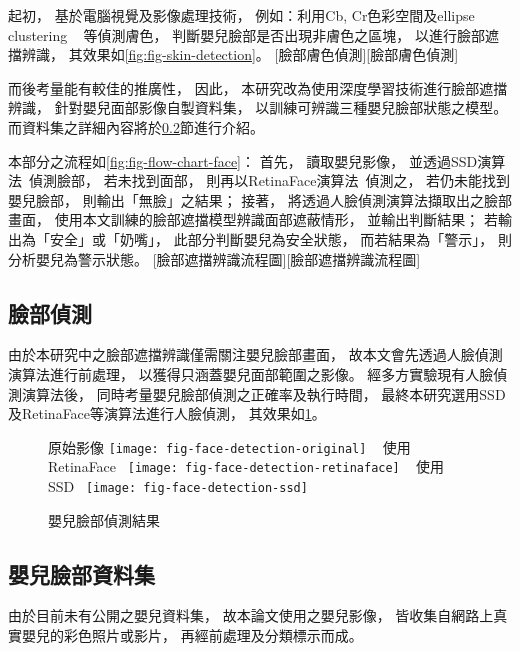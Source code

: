 \documentclass[class=NCU_thesis, crop=false]{standalone}
\begin{document}
起初，
基於電腦視覺及影像處理技術，
例如：利用Cb, Cr色彩空間及ellipse clustering
~\cite{tang_hands_2008, li_face_2011, noauthor_python_nodate, walkonnet_python_nodate}
等偵測膚色，
判斷嬰兒臉部是否出現非膚色之區塊，
以進行臉部遮擋辨識，
其效果如\cref{fig:fig-skin-detection}。
[臉部膚色偵測][臉部膚色偵測]

而後考量能有較佳的推廣性，
因此，
本研究改為使用深度學習技術進行臉部遮擋辨識，
針對嬰兒面部影像自製資料集，
以訓練可辨識三種嬰兒臉部狀態之模型。
而資料集之詳細內容將於\ref{sec:chapter_method_face_dataset}節進行介紹。

本部分之流程如\cref{fig:fig-flow-chart-face}：
首先，
讀取嬰兒影像，
並透過SSD演算法~\cite{ye_face_2021}偵測臉部，
若未找到面部，
則再以RetinaFace演算法~\cite{deng_retinaface_2020}偵測之，
若仍未能找到嬰兒臉部，
則輸出「無臉」之結果；
接著，
將透過人臉偵測演算法擷取出之臉部畫面，
使用本文訓練的臉部遮擋模型辨識面部遮蔽情形，
並輸出判斷結果；
若輸出為「安全」或「奶嘴」，
此部分判斷嬰兒為安全狀態，
而若結果為「警示」，
則分析嬰兒為警示狀態。
[臉部遮擋辨識流程圖][臉部遮擋辨識流程圖]

\subsection{臉部偵測}
由於本研究中之臉部遮擋辨識僅需關注嬰兒臉部畫面，
故本文會先透過人臉偵測演算法進行前處理，
以獲得只涵蓋嬰兒面部範圍之影像。
經多方實驗現有人臉偵測演算法後，
同時考量嬰兒臉部偵測之正確率及執行時間，
最終本研究選用SSD及RetinaFace等演算法進行人臉偵測，
其效果如\cref{fig:fig-face-detection}。
\begin{figure}[!hbt]
    \centering
    \subcaptionbox
        {原始影像
        \label{fig:fig-face-detection-original}}
        {\texttt{[image: fig-face-detection-original]}}
    ~
    \subcaptionbox
        {使用RetinaFace~\cite{deng_retinaface_2020}
        \label{fig:fig-face-detection-retinaface}}
        {\texttt{[image: fig-face-detection-retinaface]}}
    ~
    \subcaptionbox
        {使用SSD~\cite{ye_face_2021}
        \label{fig:fig-face-detection-ssd}}
        {\texttt{[image: fig-face-detection-ssd]}}
    \caption{嬰兒臉部偵測結果}
    \label{fig:fig-face-detection}
\end{figure}

\subsection{嬰兒臉部資料集}
\label{sec:chapter_method_face_dataset}
由於目前未有公開之嬰兒資料集，
故本論文使用之嬰兒影像，
皆收集自網路上真實嬰兒的彩色照片或影片，
再經前處理及分類標示而成。
\end{document}
